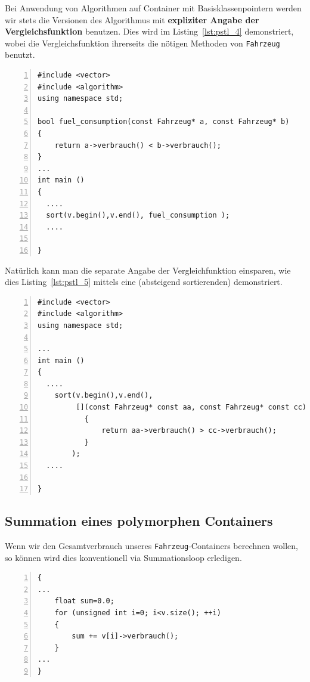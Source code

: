 Bei Anwendung von Algorithmen auf Container mit Basisklassenpointern werden wir stets die Versionen 
des Algorithmus mit \textbf{expliziter Angabe der Vergleichsfunktion} benutzen.
Dies wird im Listing~\ref{lst:pstl_4} demonstriert, wobei die Vergleichsfunktion ihrerseits die 
nötigen Methoden von \texttt{Fahrzeug} benutzt.
%
\begin{lstlisting}[caption={Korrektes Sortieren mit Vergleichsfunktion (aufsteigend)},label=lst:pstl_4,
basicstyle=\scriptsize,numbers=left, numberstyle=\tiny, stepnumber=2, numbersep=5pt]
#include <vector>
#include <algorithm>
using namespace std;

bool fuel_consumption(const Fahrzeug* a, const Fahrzeug* b)
{
    return a->verbrauch() < b->verbrauch();
}
...
int main ()
{
  ....
  sort(v.begin(),v.end(), fuel_consumption );
  ....
  
}
\end{lstlisting}

Natürlich kann man die separate Angabe der Vergleichfunktion einsparen, wie dies Listing~\ref{lst:pstl_5} 
mittels eine (absteigend sortierenden) 
 demonstriert.
%
\begin{lstlisting}[caption={Korrektes Sortieren mit Lambda-funktion (absteigend)},label=lst:pstl_5,
basicstyle=\scriptsize,numbers=left, numberstyle=\tiny, stepnumber=2, numbersep=5pt]
#include <vector>
#include <algorithm>
using namespace std;

...
int main ()
{
  ....
    sort(v.begin(),v.end(),
         [](const Fahrzeug* const aa, const Fahrzeug* const cc) -> bool
           {
               return aa->verbrauch() > cc->verbrauch();
           }
        );
  ....
  
}
\end{lstlisting}
%
%
%
%
\subsection{Summation  eines polymorphen Containers}
\label{sec:A3.3}
%
Wenn wir den Gesamtverbrauch unseres \verb|Fahrzeug|-Containers berechnen wollen, so können wird dies 
konventionell via Summationsloop erledigen.
\begin{lstlisting}[caption={Gesamverbrauch - konventionell berechnet},label=lst:pstl_6,
basicstyle=\scriptsize,numbers=left, numberstyle=\tiny, stepnumber=2, numbersep=5pt]
{
...
    float sum=0.0;
    for (unsigned int i=0; i<v.size(); ++i)
    {
        sum += v[i]->verbrauch();
    }
...  
}
\end{lstlisting}

